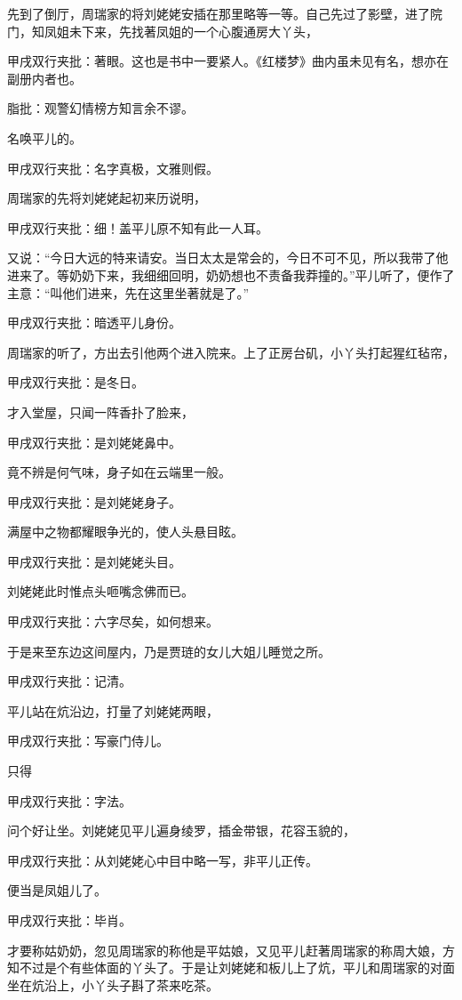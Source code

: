\begin{parag}
    先到了倒厅，周瑞家的将刘姥姥安插在那里略等一等。自己先过了影壁，进了院门，知凤姐未下来，先找著凤姐的一个心腹通房大丫头，\begin{note}甲戌双行夹批：著眼。这也是书中一要紧人。《红楼梦》曲内虽未见有名，想亦在副册内者也。\end{note}\begin{note}脂批：观警幻情榜方知言余不谬。\end{note}名唤平儿的。\begin{note}甲戌双行夹批：名字真极，文雅则假。\end{note}周瑞家的先将刘姥姥起初来历说明，\begin{note}甲戌双行夹批：细！盖平儿原不知有此一人耳。\end{note}又说：“今日大远的特来请安。当日太太是常会的，今日不可不见，所以我带了他进来了。等奶奶下来，我细细回明，奶奶想也不责备我莽撞的。”平儿听了，便作了主意：“叫他们进来，先在这里坐著就是了。”\begin{note}甲戌双行夹批：暗透平儿身份。\end{note}周瑞家的听了，方出去引他两个进入院来。上了正房台矶，小丫头打起猩红毡帘，\begin{note}甲戌双行夹批：是冬日。\end{note}才入堂屋，只闻一阵香扑了脸来，\begin{note}甲戌双行夹批：是刘姥姥鼻中。 \end{note}竟不辨是何气味，身子如在云端里一般。\begin{note}甲戌双行夹批：是刘姥姥身子。 \end{note}满屋中之物都耀眼争光的，使人头悬目眩。\begin{note}甲戌双行夹批：是刘姥姥头目。\end{note}刘姥姥此时惟点头咂嘴念佛而已。\begin{note}甲戌双行夹批：六字尽矣，如何想来。\end{note}于是来至东边这间屋内，乃是贾琏的女儿大姐儿睡觉之所。\begin{note}甲戌双行夹批：记清。\end{note}平儿站在炕沿边，打量了刘姥姥两眼，\begin{note}甲戌双行夹批：写豪门侍儿。\end{note}只得\begin{note}甲戌双行夹批：字法。\end{note}问个好让坐。刘姥姥见平儿遍身绫罗，插金带银，花容玉貌的，\begin{note}甲戌双行夹批：从刘姥姥心中目中略一写，非平儿正传。 \end{note}便当是凤姐儿了。\begin{note}甲戌双行夹批：毕肖。\end{note}才要称姑奶奶，忽见周瑞家的称他是平姑娘，又见平儿赶著周瑞家的称周大娘，方知不过是个有些体面的丫头了。于是让刘姥姥和板儿上了炕，平儿和周瑞家的对面坐在炕沿上，小丫头子斟了茶来吃茶。
\end{parag}


